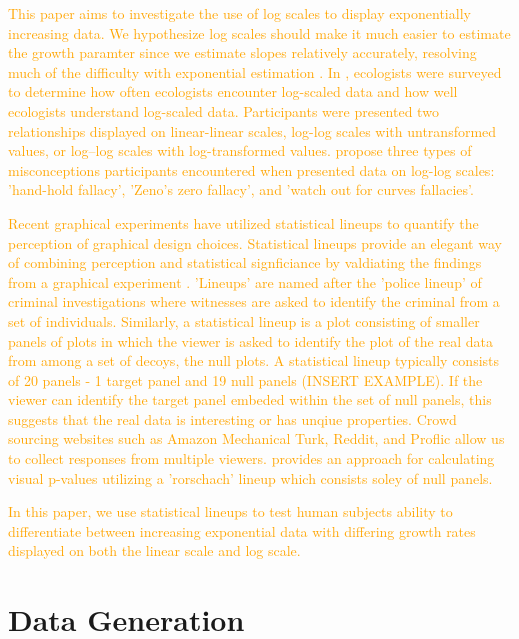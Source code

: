 \documentclass[]{interact}
\theoremstyle{plain}%
\theoremstyle{definition}
\theoremstyle{remark}
\begin{document}
\textcolor{Orange}{
This paper aims to investigate the use of log scales to display exponentially increasing data. We hypothesize log scales should make it much easier to estimate the growth paramter since we estimate slopes relatively accurately, resolving much of the difficulty with exponential estimation \citep{mosteller_eye_1981}.
In \cite{menge_logarithmic_2018}, ecologists were surveyed to determine how often ecologists encounter log-scaled data and how well ecologists understand log-scaled data. 
Participants were presented two relationships displayed on linear-linear scales, log-log scales with untransformed values, or log–log scales with log-transformed values. 
\cite{menge_logarithmic_2018} propose three types of misconceptions participants encountered when presented data on log-log scales: 'hand-hold fallacy', 'Zeno's zero fallacy', and 'watch out for curves fallacies'. 
}

\textcolor{Orange}{Recent graphical experiments have utilized statistical lineups to quantify the perception of graphical design choices\citep{vanderplas_clusters_2017}. 
Statistical lineups provide an elegant way of combining perception and statistical signficiance by valdiating the findings from a graphical experiment \citep{buja_statistical_2009, wickham2010graphical, hofmann_graphical_2012, majumder_validation_2013, vanderplas_clusters_2017}.
'Lineups' are named after the 'police lineup' of criminal investigations where witnesses are asked to identify the criminal from a set of individuals. 
Similarly, a statistical lineup is a plot consisting of smaller panels of plots in which the viewer is asked to identify the plot of the real data from among a set of decoys, the null plots. 
A statistical lineup typically consists of 20 panels - 1 target panel and 19 null panels (INSERT EXAMPLE). 
If the viewer can identify the target panel embeded within the set of null panels, this suggests that the real data is interesting or has unqiue properties.
Crowd sourcing websites such as Amazon Mechanical Turk, Reddit, and Proflic allow us to collect responses from multiple viewers.
\cite{vanderplas_statistical_nodate} provides an approach for calculating visual p-values utilizing a 'rorschach' lineup which consists soley of null panels.
}

\textcolor{Orange}{
In this paper, we use statistical lineups to test human subjects ability to differentiate between increasing exponential data with differing growth rates displayed on both the linear scale and log scale.
}

\hypertarget{data-generation}{%
\section{Data Generation}\label{data-generation}}
\end{document}
